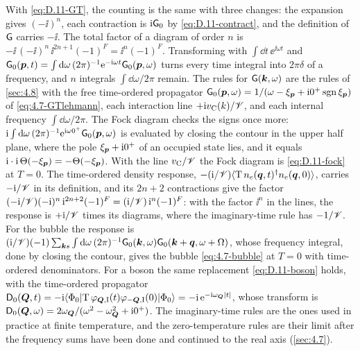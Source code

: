 With \cref{eq:D.11-GT}, the counting is the same with three changes: the expansion gives $(-\ii)^n$, each contraction is $\mathrm{i}\mathsf{G}_0$ by \cref{eq:D.11-contract}, and the definition of $\mathsf{G}$ carries $-\ii$. The total factor of a diagram of order $n$ is $-\ii\,(-\ii)^n\,\ii^{2n+1}(-1)^F = \ii^n(-1)^F$. Transforming with $\int\dd t\,\ee^{\ii\omega t}$ and $\mathsf{G}_0(\bm{p},t) = \int\mathrm{d}\omega\,(2\pi)^{-1}\mathrm{e}^{-\mathrm{i}\omega t}\mathsf{G}_0(\bm{p},\omega)$ turns every time integral into $2\pi\delta$ of a frequency, and $n$ integrals $\int\dd\omega/2\pi$ remain. The rules for $\mathsf{G}(\bm{k},\omega)$ are the rules of \cref{sec:4.8} with the free time-ordered propagator $\mathsf{G}_0(\bm{p},\omega) = 1/(\omega - \xi_{\bm{p}} + \mathrm{i}0^+\operatorname{sgn}\xi_{\bm{p}})$ of \cref{eq:4.7-GTlehmann}, each interaction line $+\mathrm{i} v_{\mathrm{C}}(k)/\mathscr{V}$, and each internal frequency $\int\dd\omega/2\pi$. The Fock diagram checks the signs once more: $\mathrm{i}\int\mathrm{d}\omega\,(2\pi)^{-1}\mathrm{e}^{\mathrm{i}\omega0^+}\mathsf{G}_0(\bm{p},\omega)$ is evaluated by closing the contour in the upper half plane, where the pole $\xi_{\bm{p}} + \mathrm{i}0^+$ of an occupied state lies, and it equals $\mathrm{i}\cdot\mathrm{i}\,\Theta(-\xi_{\bm{p}}) = -\Theta(-\xi_{\bm{p}})$. With the line $v_{\mathrm{C}}/\mathscr{V}$ the Fock diagram is \cref{eq:D.11-fock} at $T = 0$. The time-ordered density response, $-(\mathrm{i}/\mathscr{V})\langle\mathrm{T}\,n_e(\bm{q},t)^\dagger n_e(\bm{q},0)\rangle$, carries $-\mathrm{i}/\mathscr{V}$ in its definition, and its $2n + 2$ contractions give the factor $(-\mathrm{i}/\mathscr{V})(-\mathrm{i})^n\,\mathrm{i}^{2n+2}(-1)^F = (\mathrm{i}/\mathscr{V})\,\mathrm{i}^n(-1)^F$: with the factor $\ii^n$ in the lines, the response is $+\mathrm{i}/\mathscr{V}$ times its diagrams, where the imaginary-time rule has $-1/\mathscr{V}$. For the bubble the response is $(\mathrm{i}/\mathscr{V})(-1)\sum_{\bm{k}s}\int\mathrm{d}\omega\,(2\pi)^{-1}\mathsf{G}_0(\bm{k},\omega)\mathsf{G}_0(\bm{k}+\bm{q},\omega + \Omega)$, whose frequency integral, done by closing the contour, gives the bubble \cref{eq:4.7-bubble} at $T = 0$ with time-ordered denominators. For a boson the same replacement \cref{eq:D.11-boson} holds, with the time-ordered propagator $\mathsf{D}_0(\bm{Q},t) = -\mathrm{i}\langle\Phi_0|\mathrm{T}\,\varphi_{\bm{Q},\mathrm{I}}(t)\varphi_{-\bm{Q},\mathrm{I}}(0)|\Phi_0\rangle = -\mathrm{i}\,\mathrm{e}^{-\mathrm{i}\omega_{\bm{Q}}|t|}$, whose transform is $\mathsf{D}_0(\bm{Q},\omega) = 2\omega_{\bm{Q}}/(\omega^2 - \omega_{\bm{Q}}^2 + \mathrm{i}0^+)$. The imaginary-time rules are the ones used in practice at finite temperature, and the zero-temperature rules are their limit after the frequency sums have been done and continued to the real axis (\cref{sec:4.7}).
